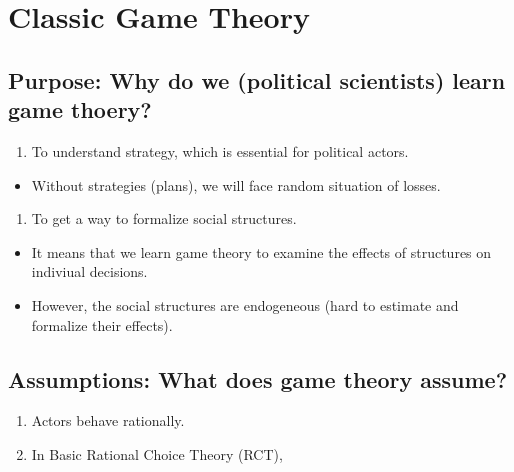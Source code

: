 \documentclass[]{book}
\providecommand{\tightlist}{%
  \setlength{\itemsep}{0pt}\setlength{\parskip}{0pt}}
\begin{document}
\hypertarget{classic-game-theory}{%
\section{Classic Game Theory}\label{classic-game-theory}}

\hypertarget{purpose-why-do-we-political-scientists-learn-game-thoery}{%
\subsection{Purpose: Why do we (political scientists) learn game thoery?}\label{purpose-why-do-we-political-scientists-learn-game-thoery}}

\begin{enumerate}
\def\labelenumi{\arabic{enumi}.}
\tightlist
\item
  To understand strategy, which is essential for political actors.
\end{enumerate}

\begin{itemize}
\tightlist
\item
  Without strategies (plans), we will face random situation of losses.
\end{itemize}

\begin{enumerate}
\def\labelenumi{\arabic{enumi}.}
\setcounter{enumi}{1}
\tightlist
\item
  To get a way to formalize social structures.
\end{enumerate}

\begin{itemize}
\tightlist
\item
  It means that we learn game theory to examine the effects of structures on indiviual decisions.
\item
  However, the social structures are endogeneous (hard to estimate and formalize their effects).
\end{itemize}

\hypertarget{assumptions-what-does-game-theory-assume}{%
\subsection{Assumptions: What does game theory assume?}\label{assumptions-what-does-game-theory-assume}}

\begin{enumerate}
\def\labelenumi{\arabic{enumi}.}
\tightlist
\item
  Actors behave rationally.
\item
  In Basic Rational Choice Theory (RCT),
\end{enumerate}
\end{document}
